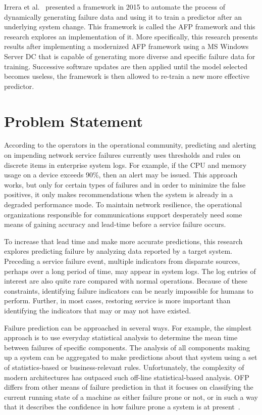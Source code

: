 Irrera et al.~\cite{irrera2015} presented a framework in 2015 to automate the
process of dynamically generating failure data and using it to train a
predictor after an underlying system change.  This framework is called the
\ac{AFP} framework and this research explores an implementation of it.  More
specifically, this research presents results after implementing a modernized
\ac{AFP} framework using a \ac{MS} Windows Server \ac{DC} that is capable of
generating more diverse and specific failure data for training.  Successive
software updates are then applied until the model selected becomes useless, the
framework is then allowed to re-train a new more effective predictor.

\section{Problem Statement}
According to the operators in the operational community, predicting and
alerting on impending network service failures currently uses thresholds and
rules on discrete items in enterprise system logs.  For example, if the
\ac{CPU} and memory usage on a device exceeds 90\%, then an alert may be
issued.  This approach works, but only for certain types of failures and in
order to minimize the false positives, it only makes recommendations when the
system is already in a degraded performance mode.  To maintain network
resilience, the operational organizations responsible for communications
support desperately need some means of gaining accuracy and lead-time before a
service failure occurs.  

To increase that lead time and make more accurate predictions, this research
explores predicting failure by analyzing data reported by a target system.
Preceding a service failure event, multiple indicators from disparate sources,
perhaps over a long period of time, may appear in system logs.  The log entries
of interest are also quite rare compared with normal operations.  Because of
these constraints, identifying failure indicators can be nearly impossible for
humans to perform.  Further, in most cases, restoring service is more important
than identifying the indicators that may or may not have existed.  

Failure prediction can be approached in several ways. For example, the simplest
approach is to use everyday statistical analysis to determine the mean time
between failures of specific components. The analysis of all components making
up a system can be aggregated to make predictions about that system using a set
of statistics-based or business-relevant rules.  Unfortunately, the complexity
of modern architectures has outpaced such off-line statistical-based analysis.
\ac{OFP} differs from other means of failure prediction in that it focuses on
classifying the current running state of a machine as either failure prone or
not, or in such a way that it describes the confidence in how failure prone a
system is at present~\cite{salfnerSurvey}.

